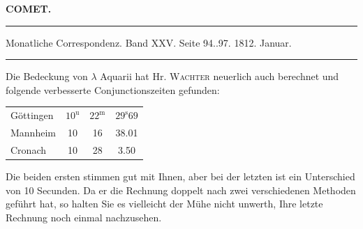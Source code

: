 \clearpage{}
\begin{center}\textbf{COMET.}\par\vspace{4pt}\hrule\vspace{4pt}\fontsize{10}{12}\selectfont Monatliche Correspondenz. Band XXV. Seite 94..97. 1812. Januar.\par\vspace{4pt}\hrule\vspace{4pt}\end{center}

\par{}

\par\indent Die Bedeckung von $\lambda$ Aquarii hat Hr. \textsc{Wachter} neuerlich auch berechnet und folgende verbesserte Conjunctionszeiten gefunden:

\begin{center}
\fontsize{10}{12}\selectfont\setlength{\tabcolsep}{6pt}\renewcommand{\arraystretch}{1.15}\begin{tabular}{l|ccc}
Göttingen & $10^{\text{u}}$ & $22^{\text{m}}$ & $29^{\text{s}}69$ \\
Mannheim & 10 & 16 & 38.01 \\
Cronach & 10 & 28 & 3.50 \\
\end{tabular}
\end{center}

\noindent Die beiden ersten stimmen gut mit Ihnen, aber bei der letzten ist ein Unterschied von 10 Secunden. Da er die Rechnung doppelt nach zwei verschiedenen Methoden geführt hat, so halten Sie es vielleicht der Mühe nicht unwerth, Ihre letzte Rechnung noch einmal nachzusehen.
